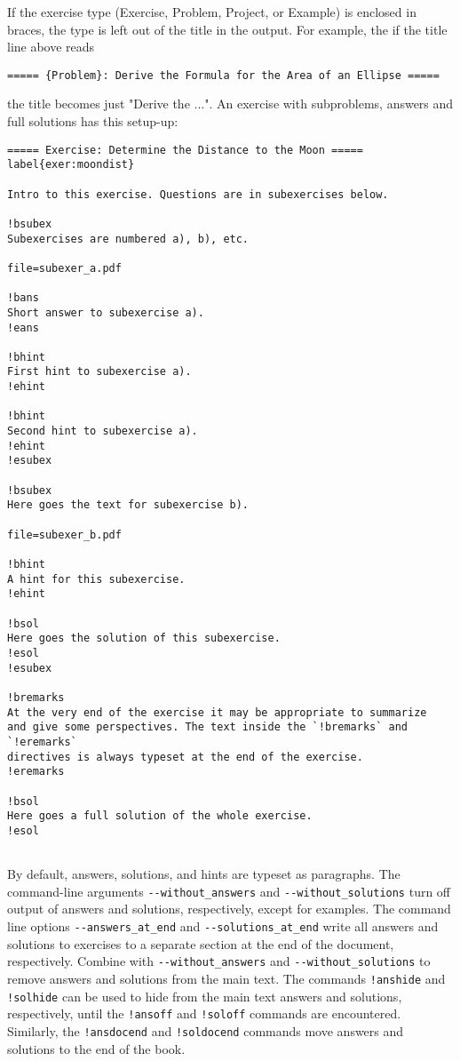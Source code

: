 \documentclass[%
oneside,                 %
final,                   %
10pt]{article}
\begin{document}
If the exercise type (Exercise, Problem, Project, or Example)
is enclosed in braces, the type is left out of the title in the
output. For example, the if the title line above reads
\begin{Verbatim}[numbers=none,fontsize=\fontsize{9pt}{9pt},baselinestretch=0.95,xleftmargin=2mm]
===== {Problem}: Derive the Formula for the Area of an Ellipse =====

\end{Verbatim}

the title becomes just "Derive the ...".
An exercise with subproblems, answers and full solutions has this
setup-up:
\begin{Verbatim}[numbers=none,fontsize=\fontsize{9pt}{9pt},baselinestretch=0.95,xleftmargin=2mm]
===== Exercise: Determine the Distance to the Moon =====
label{exer:moondist}

Intro to this exercise. Questions are in subexercises below.

!bsubex
Subexercises are numbered a), b), etc.

file=subexer_a.pdf

!bans
Short answer to subexercise a).
!eans

!bhint
First hint to subexercise a).
!ehint

!bhint
Second hint to subexercise a).
!ehint
!esubex

!bsubex
Here goes the text for subexercise b).

file=subexer_b.pdf

!bhint
A hint for this subexercise.
!ehint

!bsol
Here goes the solution of this subexercise.
!esol
!esubex

!bremarks
At the very end of the exercise it may be appropriate to summarize
and give some perspectives. The text inside the `!bremarks` and `!eremarks`
directives is always typeset at the end of the exercise.
!eremarks

!bsol
Here goes a full solution of the whole exercise.
!esol


\end{Verbatim}

By default, answers, solutions, and hints are typeset as paragraphs.
The command-line arguments \Verb!--without_answers! and \Verb!--without_solutions!
turn off output of answers and solutions, respectively, except for examples. The command line options \Verb!--answers_at_end! and \Verb!--solutions_at_end! write all answers and solutions to exercises to a separate section at the end of the document, respectively. Combine with \Verb!--without_answers! and \Verb!--without_solutions! to remove answers and solutions from the main text.
The commands \Verb?!anshide? and \Verb?!solhide? can be used to hide from the main text answers and solutions, respectively, until the \Verb?!ansoff? and \Verb?!soloff? commands are encountered. Similarly, the \Verb?!ansdocend? and \Verb?!soldocend? commands move answers and solutions to the end of the book. 
\end{document}
